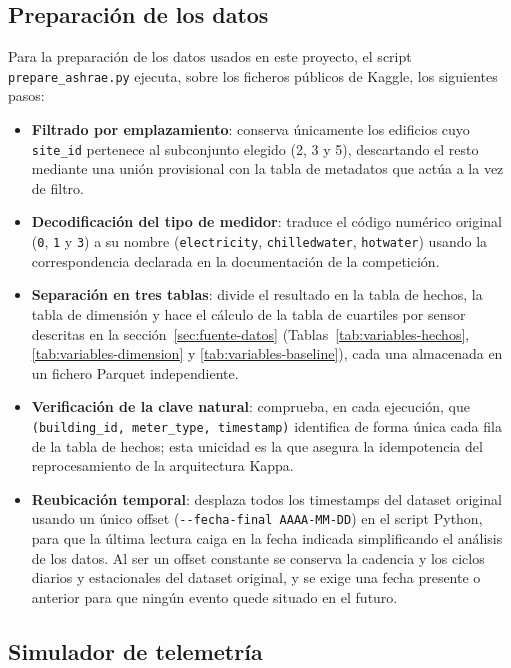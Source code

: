 \subsection{Preparación de los datos}

Para la preparación de los datos usados en este proyecto, el script \texttt{prepare\_ashrae.py} ejecuta, sobre los ficheros públicos de Kaggle, los siguientes pasos:

\begin{itemize}
    \item \textbf{Filtrado por emplazamiento}: conserva únicamente los edificios cuyo \texttt{site\_id} pertenece al subconjunto elegido (2, 3 y 5), descartando el resto mediante una unión provisional con la tabla de metadatos que actúa a la vez de filtro.
    \item \textbf{Decodificación del tipo de medidor}: traduce el código numérico original (\texttt{0}, \texttt{1} y \texttt{3}) a su nombre (\texttt{electricity}, \texttt{chilledwater}, \texttt{hotwater}) usando la correspondencia declarada en la documentación de la competición.
    \item \textbf{Separación en tres tablas}: divide el resultado en la tabla de hechos, la tabla de dimensión y hace el cálculo de la tabla de cuartiles por sensor descritas en la sección~\ref{sec:fuente-datos} (Tablas~\ref{tab:variables-hechos}, \ref{tab:variables-dimension} y \ref{tab:variables-baseline}), cada una almacenada en un fichero Parquet independiente.
    \item \textbf{Verificación de la clave natural}: comprueba, en cada ejecución, que \texttt{(building\_id, meter\_type, timestamp)} identifica de forma única cada fila de la tabla de hechos; esta unicidad es la que asegura la idempotencia del reprocesamiento de la arquitectura Kappa.
    \item \textbf{Reubicación temporal}: desplaza todos los timestamps del dataset original usando un único offset (\texttt{-{}-fecha-final AAAA-MM-DD}) en el script Python, para que la última lectura caiga en la fecha indicada simplificando el análisis de los datos. Al ser un offset constante se conserva la cadencia y los ciclos diarios y estacionales del dataset original, y se exige una fecha presente o anterior para que ningún evento quede situado en el futuro.
\end{itemize}

\subsection{Simulador de telemetría}
\label{sec:simulador}

